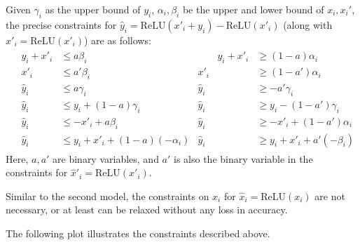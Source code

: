 \documentclass{llncs}
\newcommand{\ReLU}{\mathrm{ReLU}}
\begin{document}
	
	
	Given $\gamma_i$ as the upper bound of $y_i$, $\alpha_i,\beta_i$ be the upper and lower bound of $x_i,x_i'$, 
	the precise  constraints for $\hat{y}_i = \ReLU(x'_i+y_i)-\ReLU(x'_i)$ (along with $\hat{x}'_i=\ReLU(x'_i)$) are as follows:
	\begin{align*}
		& \begin{aligned}
			y_i + x'_i &\leq a\beta_i        &\quad\quad
			y_i + x'_i &\geq (1-a)\alpha_i \\
			x'_i       &\leq a'\beta_i       & 
			x'_i       &\geq (1-a')\alpha_i \\
			\hat{y}_i  &\leq a\gamma_i       &
			\hat{y}_i  &\geq -a'\gamma_i \\
			\hat{y}_i  &\leq y_i + (1-a)\gamma_i  &
			\hat{y}_i  &\geq y_i - (1-a')\gamma_i \\
			\hat{y}_i  &\leq -x'_i + a\beta_i &
			\hat{y}_i  &\geq -x'_i + (1-a')\alpha_i \\
			\hat{y}_i  &\leq y_i + x'_i + (1-a)(-\alpha_i) &
			\hat{y}_i  &\geq y_i + x'_i + a'(-\beta_i)
		\end{aligned}
	\end{align*} Here, $a,a'$ are binary variables, and $a'$ is also the binary variable in the constraints for $\hat{x}'_i=\ReLU(x'_i)$. 
	
	Similar to the second model, the constraints on $x_i$ for $\hat{x}_i=\ReLU(x_i)$ are not necessary, or at least can be relaxed without any loss in accuracy.
	
	
	The following plot illustrates the constraints described above.
	
\end{document}

